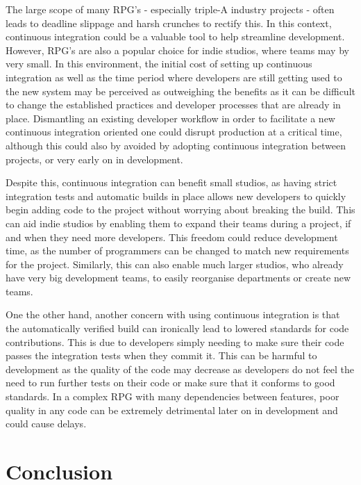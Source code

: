 \documentclass{scrartcl}
\begin{document}
The large scope of many RPG's - especially triple-A industry projects - often leads to deadline slippage and harsh crunches to rectify this. In this context, continuous integration could be a valuable tool to help streamline development. However, RPG's are also a popular choice for indie studios, where teams may by very small. In this environment, the initial cost of setting up continuous integration as well as the time period where developers are still getting used to the new system may be perceived as outweighing the benefits as it can be difficult to change the established practices and developer processes that are already in place. \cite{systematicReview} Dismantling an existing developer workflow in order to facilitate a new continuous integration oriented one could disrupt production at a critical time, although this could also by avoided by adopting continuous integration between projects, or very early on in development.

Despite this, continuous integration can benefit small studios, as having strict integration tests and automatic builds in place allows new developers to quickly begin adding code to the project without worrying about breaking the build. \cite{stateOfTheArt} This can aid indie studios by enabling them to expand their teams during a project, if and when they need more developers. This freedom could reduce development time, as the number of programmers can be changed to match new requirements for the project. Similarly, this can also enable much larger studios, who already have very big development teams, to easily reorganise departments or create new teams.

One the other hand, another concern with using continuous integration is that the automatically verified build can ironically lead to lowered standards for code contributions. This is due to developers simply needing to make sure their code passes the integration tests when they commit it. \cite{sharedUnderstanding} This can be harmful to development as the quality of the code may decrease as developers do not feel the need to run further tests on their code or make sure that it conforms to good standards. In a complex RPG with many dependencies between features, poor quality in any code can be extremely detrimental later on in development and could cause delays.

\section{Conclusion}
\end{document}
